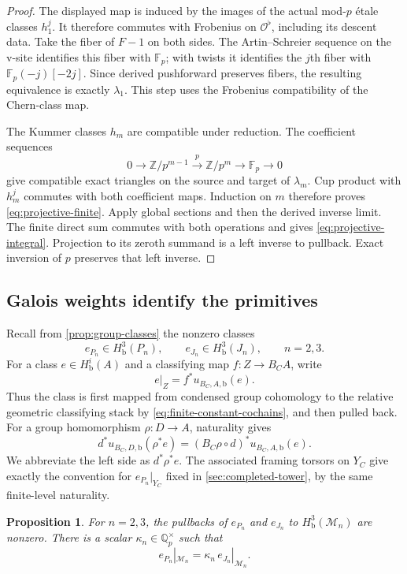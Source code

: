 \documentclass[11pt]{article}
\numberwithin{equation}{section}
\newtheorem{proposition}[theorem]{Proposition}
\theoremstyle{definition}
\theoremstyle{remark}
\begin{document}
\begin{proof}
The displayed map is induced by the images of the actual mod-$p$
\'etale classes $h_1^j$.  It therefore commutes with Frobenius on
$\mathcal O^\flat$, including its descent data.  Take the fiber of
$F-1$ on both sides.  The Artin--Schreier sequence on the v-site
identifies this fiber with $\mathbb F_p$; with twists it identifies the
$j$th fiber with $\mathbb F_p(-j)[-2j]$.
Since derived pushforward preserves fibers, the resulting equivalence
is exactly $\lambda_1$.
This step uses the Frobenius compatibility of the Chern-class map.

The Kummer classes $h_m$ are compatible under reduction.
The coefficient sequences
\[
 0\longrightarrow\mathbb Z/p^{m-1}\xrightarrow{\,p\,}\mathbb Z/p^m
       \longrightarrow\mathbb F_p\longrightarrow0
\]
give compatible exact triangles on the source and target of
$\lambda_m$.  Cup product with $h_m^j$ commutes with both coefficient
maps.  Induction on $m$ therefore proves
\cref{eq:projective-finite}.
Apply global sections and then the derived inverse limit.
The finite direct sum commutes with both operations and gives
\cref{eq:projective-integral}.  Projection to its zeroth summand
is a left inverse to pullback.  Exact inversion of $p$ preserves that
left inverse.
\end{proof}

\subsection{Galois weights identify the primitives}

Recall from \cref{prop:group-classes} the nonzero classes
\[
 e_{P_n}\in H^3_{\mathrm b}(P_n),\qquad
 e_{J_n}\in H^3_{\mathrm b}(J_n),\qquad n=2,3.
\]
For a class $e\in H^i_{\mathrm b}(A)$ and a classifying map
$f:Z\to B_CA$, write
\[
 e|_Z=f^*u_{B_C,A,\mathrm b}(e).
\]
Thus the class is first mapped from condensed group cohomology to the
relative geometric classifying stack by
\eqref{eq:finite-constant-cochains}, and then pulled back.  For a group
homomorphism $\rho:D\to A$, naturality gives
\[
 d^*u_{B_C,D,\mathrm b}(\rho^*e)
       =(B_C\rho\circ d)^*u_{B_C,A,\mathrm b}(e).
\]
We abbreviate the left side as $d^*\rho^*e$.  The associated framing
torsors on $Y_C$ give exactly the convention for $e_{P_n}|_{Y_C}$
fixed in \cref{sec:completed-tower}, by the same finite-level naturality.

\begin{proposition}\label{prop:primitive-comparison}
For $n=2,3$, the pullbacks of $e_{P_n}$ and $e_{J_n}$ to
$H^3_{\mathrm b}(\mathcal M_n)$ are nonzero.
There is a scalar $\kappa_n\in\mathbb Q_p^\times$ such that
\begin{equation}\label{eq:primitive-comparison}
 e_{P_n}|_{\mathcal M_n}
        =\kappa_n\,e_{J_n}|_{\mathcal M_n}.
\end{equation}
\end{proposition}
\end{document}
